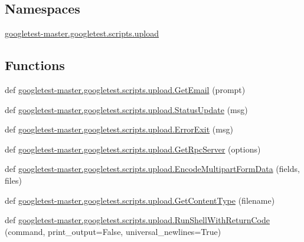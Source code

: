 \subsection*{Namespaces}
\begin{DoxyCompactItemize}
\item 
 \mbox{\hyperlink{namespacegoogletest-master_1_1googletest_1_1scripts_1_1upload}{googletest-\/master.\+googletest.\+scripts.\+upload}}
\end{DoxyCompactItemize}
\subsection*{Functions}
\begin{DoxyCompactItemize}
\item 
def \mbox{\hyperlink{namespacegoogletest-master_1_1googletest_1_1scripts_1_1upload_aabf8df42b9bd39c5511b604e04c8fd3f}{googletest-\/master.\+googletest.\+scripts.\+upload.\+Get\+Email}} (prompt)
\item 
def \mbox{\hyperlink{namespacegoogletest-master_1_1googletest_1_1scripts_1_1upload_a48cc0bb2a658b795c535a98493208ebb}{googletest-\/master.\+googletest.\+scripts.\+upload.\+Status\+Update}} (msg)
\item 
def \mbox{\hyperlink{namespacegoogletest-master_1_1googletest_1_1scripts_1_1upload_a7da92ea4ed68a1cae6a56be7bd1cd580}{googletest-\/master.\+googletest.\+scripts.\+upload.\+Error\+Exit}} (msg)
\item 
def \mbox{\hyperlink{namespacegoogletest-master_1_1googletest_1_1scripts_1_1upload_a0d43430fe29dfdac2c8c24578249fd49}{googletest-\/master.\+googletest.\+scripts.\+upload.\+Get\+Rpc\+Server}} (options)
\item 
def \mbox{\hyperlink{namespacegoogletest-master_1_1googletest_1_1scripts_1_1upload_aeb3f87241f2743e716fa7c722f6753bf}{googletest-\/master.\+googletest.\+scripts.\+upload.\+Encode\+Multipart\+Form\+Data}} (fields, files)
\item 
def \mbox{\hyperlink{namespacegoogletest-master_1_1googletest_1_1scripts_1_1upload_aa345cb0158210c30312dac0d71af1e9e}{googletest-\/master.\+googletest.\+scripts.\+upload.\+Get\+Content\+Type}} (filename)
\item 
def \mbox{\hyperlink{namespacegoogletest-master_1_1googletest_1_1scripts_1_1upload_a945f111822c0912629048f532480fd3f}{googletest-\/master.\+googletest.\+scripts.\+upload.\+Run\+Shell\+With\+Return\+Code}} (command, print\+\_\+output=False, universal\+\_\+newlines=True)
\item 

\end{DoxyCompactItemize}
